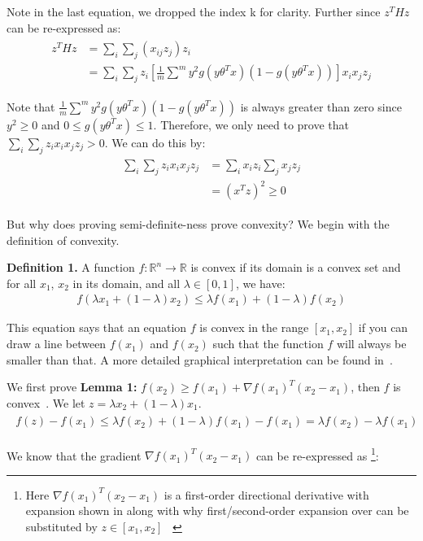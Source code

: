 \documentclass[11pt]{article}
\begin{document}
Note in the last equation, we dropped the index k for clarity. Further since $z^THz$ can be re-expressed as:
\begin{align}
		\begin{split}
		z^THz &= \sum_{i}\sum_{j}(x_{ij}z_j)z_i \\
		&= \sum_{i}\sum_{j}z_i[\frac{1}{m}\sum^{m}y^2g(y\theta^Tx)(1-g(y\theta^Tx))]x_ix_jz_j
		\end{split}
\end{align}

Note that $\frac{1}{m}\sum^{m}y^2g(y\theta^Tx)(1-g(y\theta^Tx))$ is always greater than zero since $y^2 \geq 0$ and $0 \leq g(y\theta^Tx) \leq 1$. 
Therefore, we only need to prove that $\sum_{i}\sum_{j}z_ix_ix_jz_j>0$. We can do this by:
\begin{align}
		\begin{split}
		\sum_{i}\sum_{j}z_ix_ix_jz_j &= \sum_{i}x_iz_i\sum_{j}x_jz_j \\
		&= (x^Tz)^2 \geq 0 
		\end{split}
\end{align}

But why does proving semi-definite-ness prove convexity? We begin with the definition of convexity.

\textbf{Definition 1.} A function $f: \mathbb{R}^n \rightarrow \mathbb{R}$ is convex if its domain 
is a convex set and for all $x_1$, $x_2$ in its domain, and all $\lambda \in [0,1]$, we have:
\begin{align}
	f(\lambda x_1+(1-\lambda)x_2) \leq \lambda f(x_1) + (1-\lambda)f(x_2)
\end{align}

This equation says that an equation $f$ is convex in the range $[x_1, x_2]$ if you can draw a line between 
$f(x_1)$ and $f(x_2)$ such that the function $f$ will always be smaller than that. A more detailed 
graphical interpretation can be found in~\cite{convexity}.

We first prove \textbf{Lemma 1:} $f(x_2) \geq f(x_1) + \nabla f(x_1)^T(x_2-x_1)$, then $f$ is 
convex~\cite{characterConvexity}. 
We let $z=\lambda x_2 + (1-\lambda)x_1$. 
\begin{align}
	\begin{split}
		f(z)-f(x_1) \leq \lambda f(x_2) + (1-\lambda)f(x_1) - f(x_1) = \lambda f(x_2) - \lambda f(x_1)
	\end{split}
\end{align}

We know that the gradient $\nabla f(x_1)^T(x_2-x_1)$ can be re-expressed as
\footnote{Here $\nabla f(x_1)^T(x_2-x_1)$ is a first-order directional derivative with expansion 
shown in along with why first/second-order expansion over can be substituted by $z \in [x_1,x_2]$
~\cite{directionalDerivative}}:
\end{document}
